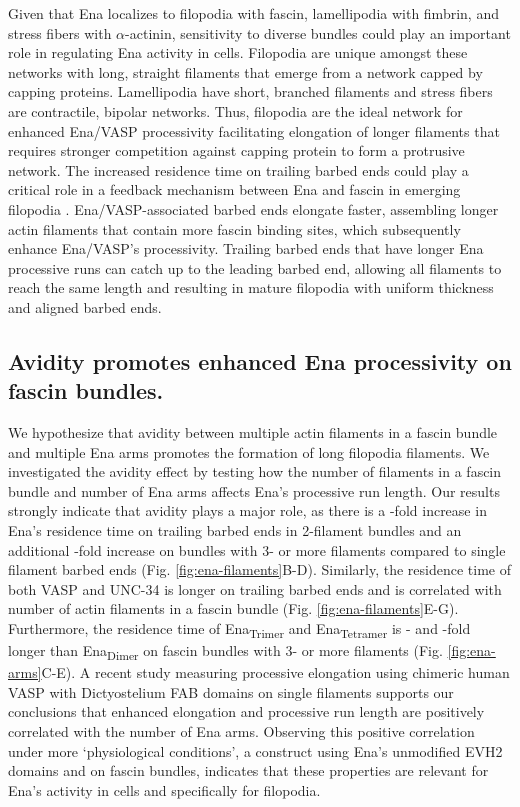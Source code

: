 Given that Ena localizes to filopodia with fascin, lamellipodia with fimbrin, and stress fibers with $\alpha$-actinin, sensitivity to diverse bundles could play an important role in regulating Ena activity in cells. Filopodia are unique amongst these networks with long, straight filaments that emerge from a network capped by capping proteins. Lamellipodia have short, branched filaments and stress fibers are contractile, bipolar networks. Thus, filopodia are the ideal network for enhanced Ena/VASP processivity facilitating elongation of longer filaments that requires stronger competition against capping protein to form a protrusive network. The increased residence time on trailing barbed ends could play a critical role in a feedback mechanism between Ena and fascin in emerging filopodia \citep{winkelman_ena/vasp_2014}. Ena/VASP-associated barbed ends elongate faster, assembling longer actin filaments that contain more fascin binding sites, which subsequently enhance Ena/VASP's processivity. Trailing barbed ends that have longer Ena processive runs can catch up to the leading barbed end, allowing all filaments to reach the same length and resulting in mature filopodia with uniform thickness and aligned barbed ends.
 
\subsection{Avidity promotes enhanced Ena processivity on fascin bundles.}\label{avidity-processivity}

We hypothesize that avidity between multiple actin filaments in a fascin bundle and multiple Ena arms promotes the formation of long filopodia filaments. We investigated the avidity effect by testing how the number of filaments in a fascin bundle and number of Ena arms affects Ena's processive run length. Our results strongly indicate that avidity plays a major role, as there is a -fold increase in Ena's residence time on trailing barbed ends in 2-filament bundles and an additional -fold increase on bundles with 3- or more filaments compared to single filament barbed ends (Fig. \ref{fig:ena-filaments}B-D). Similarly, the residence time of both VASP and UNC-34 is longer on trailing barbed ends and is correlated with number of actin filaments in a fascin bundle (Fig. \ref{fig:ena-filaments}E-G). Furthermore, the residence time of Ena\textsubscript{Trimer} and Ena\textsubscript{Tetramer} is - and -fold longer than Ena\textsubscript{Dimer} on fascin bundles with 3- or more filaments (Fig. \ref{fig:ena-arms}C-E). A recent study measuring processive elongation using chimeric human VASP with Dictyostelium FAB domains on single filaments \citep{bruhmann_distinct_2017} supports our conclusions that enhanced elongation and processive run length are positively correlated with the number of Ena arms. Observing this positive correlation under more ‘physiological conditions', a construct using Ena's unmodified EVH2 domains and on fascin bundles, indicates that these properties are relevant for Ena's activity in cells and specifically for filopodia. 

